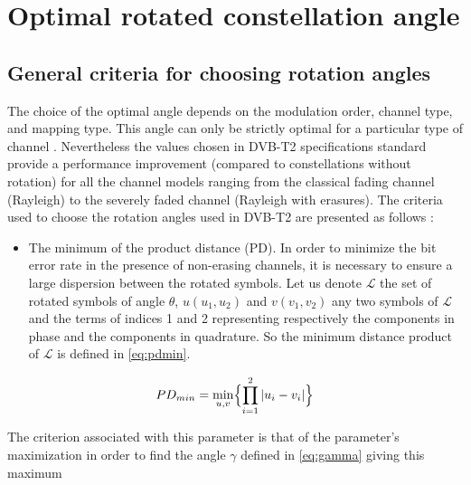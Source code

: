 
\section{Optimal rotated constellation angle}
\label{sec:optimal-angle}

\subsection{General criteria for choosing rotation angles}
\label{subsec:general-criteria}

The choice of the optimal angle depends on the modulation order, channel
type, and mapping type. This angle can only be strictly optimal for a
particular type of channel \cite{ref16,ref17}. Nevertheless the
values chosen in DVB-T2 specifications standard provide a performance
improvement (compared to constellations without rotation) for all the
channel models ranging from the classical fading channel (Rayleigh) to the
severely faded channel (Rayleigh with erasures). The criteria used to choose
the rotation angles used in DVB-T2 are presented as follows
\cite{ref18}:

\begin{itemize}
  \item The minimum of the product distance (PD). In order to minimize the
  bit error rate in the presence of non-erasing channels, it is necessary
  to ensure a large dispersion between the rotated symbols. Let us denote
  $\mathcal{L}$ the set of rotated symbols of angle $\theta$,
  $u(u_1,u_2)$ and $v(v_1,v_2)$ any two symbols of $\mathcal{L}$ and the
  terms of indices 1 and 2 representing respectively the components in
  phase and the components in quadrature. So the minimum distance product
  of $\mathcal{L}$ is defined in \eqref{eq:pdmin}.
\end{itemize}

\begin{equation}
  PD_{min} = \min_{u,v}\Bigl\{\prod_{i=1}^{2}|u_i - v_i|\Bigr\}
  \label{eq:pdmin}
\end{equation}

The criterion associated with this parameter is that of the parameter's
maximization in order to find the angle $\gamma$ defined in
\eqref{eq:gamma} giving this maximum

